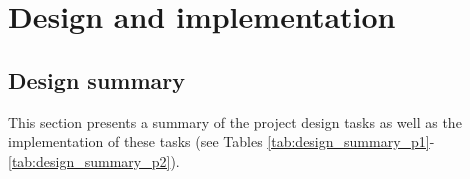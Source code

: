 
\section{Design and implementation}


\subsection{Design summary}

This section presents a summary of the project design tasks as well as the implementation of these tasks (see Tables \ref{tab:design_summary_p1}-\ref{tab:design_summary_p2}).

